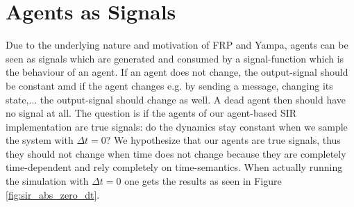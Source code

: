 \section{Agents as Signals}
Due to the underlying nature and motivation of FRP and Yampa, agents can be seen as signals which are generated and consumed by a signal-function which is the behaviour of an agent.  If an agent does not change, the output-signal should be constant amd if the agent changes e.g. by sending a message, changing its state,... the output-signal should change as well. A dead agent then should have no signal at all.
The question is if the agents of our agent-based SIR implementation are true signals: do the dynamics stay constant when we sample the system with $\Delta t = 0$? We hypothesize that our agents are true signals, thus they should not change when time does not change because they are completely time-dependent and rely completely on time-semantics. When actually running the simulation with $\Delta t = 0$ one gets the results as seen in Figure \ref{fig:sir_abs_zero_dt}.

